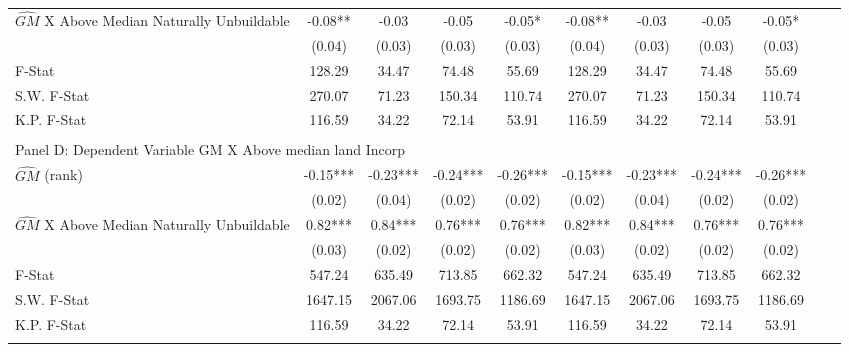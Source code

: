 \begin{table}[htbp]
\begin{threeparttable}
\begin{tabular}{l*{10}{c}}
\addlinespace
$\hat{GM}$ X Above Median Naturally Unbuildable&      -0.08** &      -0.03   &      -0.05   &      -0.05*  &      -0.08** &      -0.03   &      -0.05   &      -0.05*  \\
                &     (0.04)   &     (0.03)   &     (0.03)   &     (0.03)   &     (0.04)   &     (0.03)   &     (0.03)   &     (0.03)   \\
\midrule
F-Stat          &     128.29   &      34.47   &      74.48   &      55.69   &     128.29   &      34.47   &      74.48   &      55.69   \\
S.W. F-Stat     &     270.07   &      71.23   &     150.34   &     110.74   &     270.07   &      71.23   &     150.34   &     110.74   \\
K.P. F-Stat     &     116.59   &      34.22   &      72.14   &      53.91   &     116.59   &      34.22   &      72.14   &      53.91   \\
\cmidrule[\heavyrulewidth](lr){1-9} \\ \cmidrule[\heavyrulewidth](lr){1-9}
\multicolumn{8}{l}{Panel D: Dependent Variable GM X Above median land Incorp}\\
\cmidrule(lr){1-9}
$\hat{GM}$ (rank)&      -0.15***&      -0.23***&      -0.24***&      -0.26***&      -0.15***&      -0.23***&      -0.24***&      -0.26***\\
                &     (0.02)   &     (0.04)   &     (0.02)   &     (0.02)   &     (0.02)   &     (0.04)   &     (0.02)   &     (0.02)   \\
\addlinespace
$\hat{GM}$ X Above Median Naturally Unbuildable&       0.82***&       0.84***&       0.76***&       0.76***&       0.82***&       0.84***&       0.76***&       0.76***\\
                &     (0.03)   &     (0.02)   &     (0.02)   &     (0.02)   &     (0.03)   &     (0.02)   &     (0.02)   &     (0.02)   \\
\midrule
F-Stat          &     547.24   &     635.49   &     713.85   &     662.32   &     547.24   &     635.49   &     713.85   &     662.32   \\
S.W. F-Stat     &    1647.15   &    2067.06   &    1693.75   &    1186.69   &    1647.15   &    2067.06   &    1693.75   &    1186.69   \\
K.P. F-Stat     &     116.59   &      34.22   &      72.14   &      53.91   &     116.59   &      34.22   &      72.14   &      53.91   \\
\cmidrule[\heavyrulewidth](lr){1-9} \\ \cmidrule[\heavyrulewidth](lr){1-9}

\end{tabular}
\end{threeparttable}
\end{table}
